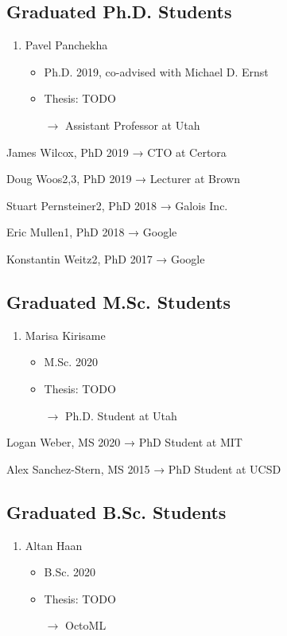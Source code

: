 \documentclass[10pt]{article}
\begin{document}

\subsection*{Graduated Ph.D. Students}

\begin{enumerate}[resume]
  \item Pavel Panchekha
    \begin{itemize}
      \item Ph.D. 2019, co-advised with Michael D. Ernst
      \item Thesis: TODO
      \item[$\rightarrow$] Assistant Professor at Utah
    \end{itemize}
\end{enumerate}

James Wilcox, PhD 2019
    → CTO at Certora

Doug Woos2,3, PhD 2019
    → Lecturer at Brown

Stuart Pernsteiner2, PhD 2018
    → Galois Inc.

Eric Mullen1, PhD 2018
    → Google

Konstantin Weitz2, PhD 2017
    → Google

\subsection*{Graduated M.Sc. Students}

\begin{enumerate}[resume]
  \item Marisa Kirisame
    \begin{itemize}
      \item M.Sc. 2020
      \item Thesis: TODO
      \item[$\rightarrow$] Ph.D. Student at Utah
    \end{itemize}
\end{enumerate}

Logan Weber, MS 2020
    → PhD Student at MIT

Alex Sanchez-Stern, MS 2015
    → PhD Student at UCSD

\subsection*{Graduated B.Sc. Students}

\begin{enumerate}[resume]
  \item Altan Haan
    \begin{itemize}
      \item B.Sc. 2020
      \item Thesis: TODO
      \item[$\rightarrow$] OctoML
    \end{itemize}
\end{enumerate}
\end{document}
